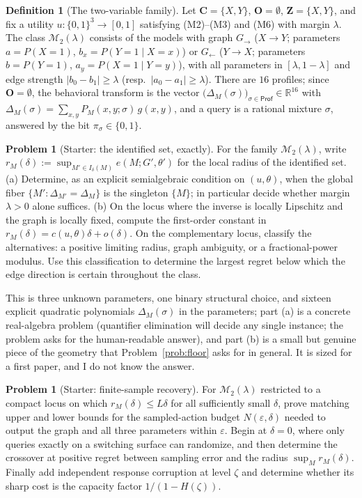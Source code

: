 \documentclass[11pt]{amsart}
\theoremstyle{plain}
\theoremstyle{definition}
\newtheorem{definition}[theorem]{Definition}
\newtheorem{problem}[theorem]{Problem}
\newcommand{\bC}{\mathbf{C}}
\newcommand{\bO}{\mathbf{O}}
\newcommand{\bZ}{\mathbf{Z}}
\newcommand{\MM}{\mathcal{M}}
\newcommand{\Prof}{\mathsf{Prof}}
\begin{document}
\begin{definition}[The two-variable family]\label{def:twovar}
Let $\bC=\{X,Y\}$, $\bO=\emptyset$, $\bZ=\{X,Y\}$, and fix a utility $u\colon\{0,1\}^3\to[0,1]$ satisfying (M2)--(M3) and (M6) with margin $\lambda$. The class $\MM_2(\lambda)$ consists of the models with graph $G_\to$ ($X\to Y$; parameters $a=P(X\!=\!1)$, $b_x=P(Y\!=\!1\mid X\!=\!x)$) or $G_\leftarrow$ ($Y\to X$; parameters $b=P(Y\!=\!1)$, $a_y=P(X\!=\!1\mid Y\!=\!y)$), with all parameters in $[\lambda,1-\lambda]$ and edge strength $|b_0-b_1|\ge\lambda$ (resp.\ $|a_0-a_1|\ge\lambda$). There are $16$ profiles; since $\bO=\emptyset$, the behavioral transform is the vector $\bigl(\Delta_M(\sigma)\bigr)_{\sigma\in\Prof}\in\mathbb{R}^{16}$ with $\Delta_M(\sigma)=\sum_{x,y}P_M(x,y;\sigma)\,g(x,y)$, and a query is a rational mixture $\sigma$, answered by the bit $\pi_\sigma\in\{0,1\}$.
\end{definition}

\begin{problem}[Starter: the identified set, exactly]\label{prob:starter-set}
For the family $\MM_2(\lambda)$, write $r_M(\delta):=\sup_{M'\in I_\delta(M)}e(M;G',\theta')$ for the local radius of the identified set. (a) Determine, as an explicit semialgebraic condition on $(u,\theta)$, when the global fiber $\{M':\Delta_{M'}=\Delta_M\}$ is the singleton $\{M\}$; in particular decide whether margin $\lambda>0$ alone suffices. (b) On the locus where the inverse is locally Lipschitz and the graph is locally fixed, compute the first-order constant in $r_M(\delta)=c(u,\theta)\delta+o(\delta)$. On the complementary locus, classify the alternatives: a positive limiting radius, graph ambiguity, or a fractional-power modulus. Use this classification to determine the largest regret below which the edge direction is certain throughout the class.
\end{problem}

This is three unknown parameters, one binary structural choice, and sixteen explicit quadratic polynomials $\Delta_M(\sigma)$ in the parameters; part (a) is a concrete real-algebra problem (quantifier elimination will decide any single instance; the problem asks for the human-readable answer), and part (b) is a small but genuine piece of the geometry that Problem~\ref{prob:floor} asks for in general. It is sized for a first paper, and I do not know the answer.

\begin{problem}[Starter: finite-sample recovery]\label{prob:starter-sample}
For $\MM_2(\lambda)$ restricted to a compact locus on which $r_M(\delta)\le L\delta$ for all sufficiently small $\delta$, prove matching upper and lower bounds for the sampled-action budget $N(\varepsilon,\delta)$ needed to output the graph and all three parameters within $\varepsilon$. Begin at $\delta=0$, where only queries exactly on a switching surface can randomize, and then determine the crossover at positive regret between sampling error and the radius $\sup_M r_M(\delta)$. Finally add independent response corruption at level $\zeta$ and determine whether its sharp cost is the capacity factor $1/(1-H(\zeta))$.
\end{problem}
\end{document}

